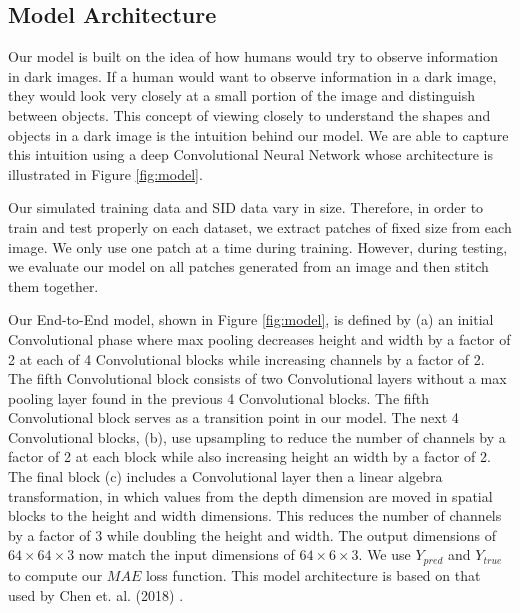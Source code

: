 \documentclass{article}
\begin{document}
\subsection{Model Architecture}
Our model is built on the idea of how humans would try to observe information in dark images. If a human would want to observe information in a dark image, they would look very closely at a small portion of the image and distinguish between objects. This concept of viewing closely to understand the shapes and objects in a dark image is the intuition behind our model. We are able to capture this intuition using a deep Convolutional Neural Network whose architecture is illustrated in  Figure \ref{fig:model}.

Our simulated training data and SID data vary in size. Therefore, in order to train and test properly on each dataset, we extract patches of fixed size from each image. We only use one patch at a time during training. However, during testing, we evaluate our model on all patches generated from an image and then stitch them together. 

Our End-to-End model, shown in Figure \ref{fig:model}, is defined by (a) an initial Convolutional phase where max pooling decreases height and width by a factor of 2 at each of 4 Convolutional blocks while increasing channels by a factor of 2. The fifth Convolutional block consists of two Convolutional layers without a max pooling layer found in the previous 4 Convolutional blocks. The fifth Convolutional block serves as a transition point in our model. The next 4 Convolutional blocks, (b), use upsampling to reduce the number of channels by a factor of 2 at each block while also increasing height an width by a factor of 2. The final block (c) includes a Convolutional layer then a linear algebra transformation, in which values from the depth dimension are moved in spatial blocks to the height and width dimensions. This reduces the number of channels by a factor of 3 while doubling the height and width. The output dimensions of $64 \times 64 \times 3$ now match the input dimensions of $64 \times 6 \times 3$. We use $Y_{pred}$ and $Y_{true}$ to compute our $MAE$ loss function. This model architecture is based on that used by Chen et. al. (2018) \cite{chen2018learning}. 
\end{document}
